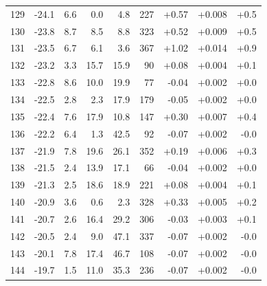 \begin{longtable}{@{}r r r r r r r r r@{}}
129 & -24.1 & 6.6 & 0.0 & 4.8 & 227 & \cellcolor{green!20}+0.57 & \cellcolor{yellow!18}+0.008 & \cellcolor{orange!17}+0.5 \\
130 & -23.8 & 8.7 & 8.5 & 8.8 & 323 & \cellcolor{green!20}+0.52 & \cellcolor{yellow!19}+0.009 & \cellcolor{orange!18}+0.5 \\
131 & -23.5 & 6.7 & 6.1 & 3.6 & 367 & \cellcolor{green!23}+1.02 & \cellcolor{yellow!21}+0.014 & \cellcolor{orange!20}+0.9 \\
132 & -23.2 & 3.3 & 15.7 & 15.9 & 90 & \cellcolor{green!16}+0.08 & \cellcolor{yellow!16}+0.004 & \cellcolor{orange!16}+0.1 \\
133 & -22.8 & 8.6 & 10.0 & 19.9 & 77 & \cellcolor{green!15}-0.04 & \cellcolor{yellow!15}+0.002 & \cellcolor{orange!15}+0.0 \\
134 & -22.5 & 2.8 & 2.3 & 17.9 & 179 & \cellcolor{green!15}-0.05 & \cellcolor{yellow!15}+0.002 & \cellcolor{orange!15}+0.0 \\
135 & -22.4 & 7.6 & 17.9 & 10.8 & 147 & \cellcolor{green!18}+0.30 & \cellcolor{yellow!18}+0.007 & \cellcolor{orange!17}+0.4 \\
136 & -22.2 & 6.4 & 1.3 & 42.5 & 92 & \cellcolor{green!15}-0.07 & \cellcolor{yellow!15}+0.002 & \cellcolor{orange!15}-0.0 \\
137 & -21.9 & 7.8 & 19.6 & 26.1 & 352 & \cellcolor{green!17}+0.19 & \cellcolor{yellow!17}+0.006 & \cellcolor{orange!16}+0.3 \\
138 & -21.5 & 2.4 & 13.9 & 17.1 & 66 & \cellcolor{green!15}-0.04 & \cellcolor{yellow!15}+0.002 & \cellcolor{orange!15}+0.0 \\
139 & -21.3 & 2.5 & 18.6 & 18.9 & 221 & \cellcolor{green!16}+0.08 & \cellcolor{yellow!16}+0.004 & \cellcolor{orange!16}+0.1 \\
140 & -20.9 & 3.6 & 0.6 & 2.3 & 328 & \cellcolor{green!18}+0.33 & \cellcolor{yellow!17}+0.005 & \cellcolor{orange!16}+0.2 \\
141 & -20.7 & 2.6 & 16.4 & 29.2 & 306 & \cellcolor{green!15}-0.03 & \cellcolor{yellow!15}+0.003 & \cellcolor{orange!15}+0.1 \\
142 & -20.5 & 2.4 & 9.0 & 47.1 & 337 & \cellcolor{green!15}-0.07 & \cellcolor{yellow!15}+0.002 & \cellcolor{orange!15}-0.0 \\
143 & -20.1 & 7.8 & 17.4 & 46.7 & 108 & \cellcolor{green!15}-0.07 & \cellcolor{yellow!15}+0.002 & \cellcolor{orange!15}-0.0 \\
144 & -19.7 & 1.5 & 11.0 & 35.3 & 236 & \cellcolor{green!15}-0.07 & \cellcolor{yellow!15}+0.002 & \cellcolor{orange!15}-0.0 \\

\end{longtable}
